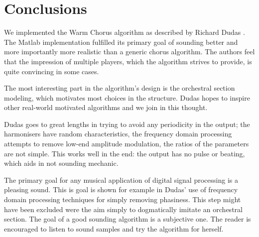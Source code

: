 \section{Conclusions}
We implemented the Warm Chorus algorithm as described by Richard Dudas \cite{dudas}. The Matlab implementation fulfilled its primary goal of sounding better and more importantly more realistic than a generic chorus algorithm. The authors feel that the impression of multiple players, which the algorithm strives to provide, is quite convincing in some cases.

The most interesting part in the algorithm's design is the orchestral section modeling, which motivates most choices in the structure. Dudas hopes to inspire other real-world motivated algorithms \cite{dudas} and we join in this thought.

Dudas goes to great lengths in trying to avoid any periodicity in the output; the harmonisers have random characteristics, the frequency domain processing attempts to remove low-end amplitude modulation, the ratios of the parameters are not simple. This works well in the end: the output has no pulse or beating, which aids in not sounding mechanic.

The primary goal for any musical application of digital signal processing is a pleasing sound. This is goal is shown for example in Dudas' use of frequency domain processing techniques for simply removing phasiness. This step might have been excluded were the aim simply to dogmatically imitate an orchestral section. The goal of a good sounding algorithm is a subjective one. The reader is encouraged to listen to sound samples and try the algorithm for herself.

